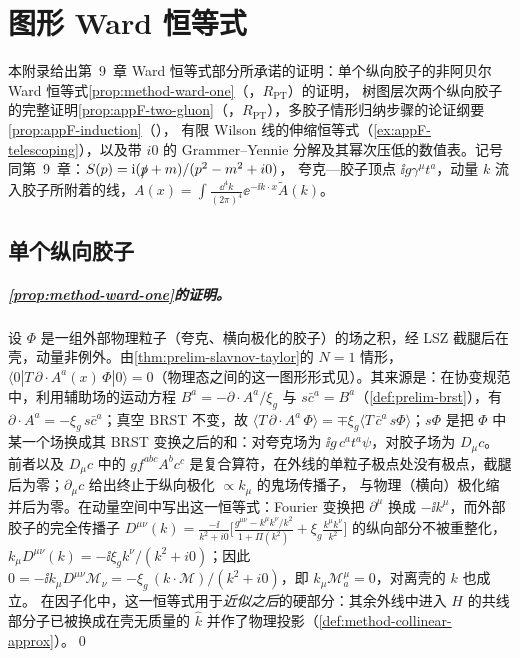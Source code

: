 \chapter{图形 Ward 恒等式}\label{app:appF}

本附录给出第~9~章 Ward 恒等式部分所承诺的证明：单个纵向胶子的非阿贝尔 Ward 恒等式\cref{prop:method-ward-one}（\tagR，$R_{\mathrm{PT}}$）的证明，
树图层次两个纵向胶子的完整证明\cref{prop:appF-two-gluon}（\tagR，$R_{\mathrm{PT}}$），多胶子情形归纳步骤的论证纲要\cref{prop:appF-induction}（\tagA），
有限 Wilson 线的伸缩恒等式（\cref{ex:appF-telescoping}），以及带 $i0$ 的 Grammer--Yennie 分解及其幂次压低的数值表。记号同第~9~章：$S(p)=\mathrm{i}(\slashed{p}+m)/(p^2-m^2+i0)$，
夸克—胶子顶点 $\ii g\gamma^\mu t^a$，动量 $k$ 流入胶子所附着的线，$A(x)=\int\frac{\dd^4k}{(2\pi)^4}\ee^{-\ii k\cdot x}\tilde A(k)$。

\section{单个纵向胶子}\label{sec:appF-one}

\paragraph{\cref{prop:method-ward-one}的证明。}
设 $\Phi$ 是一组外部物理粒子（夸克、横向极化的胶子）的场之积，经 LSZ 截腿后在壳，动量非例外。由\cref{thm:prelim-slavnov-taylor}的 $N=1$ 情形，
$\langle0|T\,\partial\cdot A^a(x)\,\Phi|0\rangle=0$（物理态之间的这一图形形式见\cite[第~8.2~节，式~(131)]{CollinsSoperSterman1989}）。其来源是：在协变规范中，利用辅助场的运动方程 $B^a=-\partial\cdot A^a/\xi_g$ 与 $s\bar c^a=B^a$（\cref{def:prelim-brst}），有 $\partial\cdot A^a=-\xi_g\,s\bar c^a$；真空 BRST 不变，故
$\langle T\,\partial\cdot A^a\,\Phi\rangle=\mp\xi_g\langle T\,\bar c^a\,s\Phi\rangle$；$s\Phi$ 是把 $\Phi$ 中某一个场换成其 BRST 变换之后的和：对夸克场为 $\ii g\,c^at^a\psi$，对胶子场为 $D_\mu c$。
前者以及 $D_\mu c$ 中的 $gf^{abc}A^bc^c$ 是复合算符，在外线的单粒子极点处没有极点，截腿后为零；$\partial_\mu c$ 给出终止于纵向极化 $\propto k_\mu$ 的鬼场传播子，
与物理（横向）极化缩并后为零。在动量空间中写出这一恒等式：Fourier 变换把 $\partial^\mu$ 换成 $-\ii k^\mu$，而外部胶子的完全传播子
$D^{\mu\nu}(k)=\frac{-\ii}{k^2+i0}\bigl[\frac{g^{\mu\nu}-k^\mu k^\nu/k^2}{1+\Pi(k^2)}+\xi_g\frac{k^\mu k^\nu}{k^2}\bigr]$ 的纵向部分不被重整化，
$k_\mu D^{\mu\nu}(k)=-\ii\xi_gk^\nu/(k^2+i0)$；因此 $0=-\ii k_\mu D^{\mu\nu}\mathcal M_\nu=-\xi_g\,(k\cdot\mathcal M)/(k^2+i0)$，即 $k_\mu\mathcal M^\mu_a=0$，对离壳的 $k$ 也成立。
在因子化中，这一恒等式用于\emph{近似之后}的硬部分：其余外线中进入 $H$ 的共线部分子已被换成在壳无质量的 $\hat k$ 并作了物理投影（\cref{def:method-collinear-approx}）。\qed

